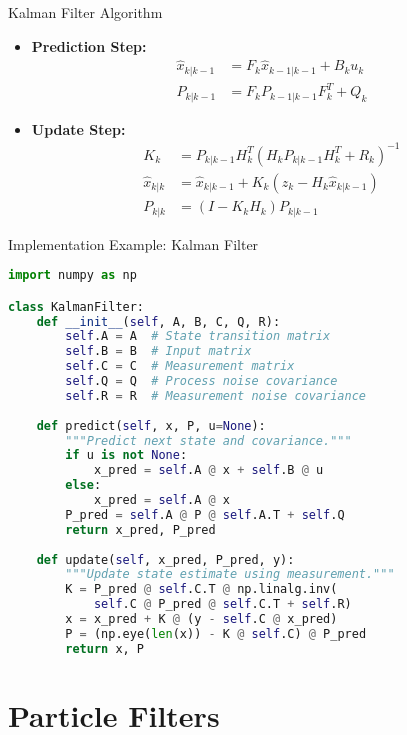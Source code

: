 \documentclass[aspectratio=169]{beamer}
\begin{document}
\begin{frame}{Kalman Filter Algorithm}
    \begin{itemize}
        \item<1-> \textbf{Prediction Step:}
            \begin{align*}
                \hat{x}_{k|k-1} &= F_k\hat{x}_{k-1|k-1} + B_ku_k \\
                P_{k|k-1} &= F_kP_{k-1|k-1}F_k^T + Q_k
            \end{align*}
        \item<2-> \textbf{Update Step:}
            \begin{align*}
                K_k &= P_{k|k-1}H_k^T(H_kP_{k|k-1}H_k^T + R_k)^{-1} \\
                \hat{x}_{k|k} &= \hat{x}_{k|k-1} + K_k(z_k - H_k\hat{x}_{k|k-1}) \\
                P_{k|k} &= (I - K_kH_k)P_{k|k-1}
            \end{align*}
    \end{itemize}
\end{frame}

\begin{frame}[fragile]{Implementation Example: Kalman Filter}
\begin{lstlisting}[language=Python]
import numpy as np

class KalmanFilter:
    def __init__(self, A, B, C, Q, R):
        self.A = A  # State transition matrix
        self.B = B  # Input matrix
        self.C = C  # Measurement matrix
        self.Q = Q  # Process noise covariance
        self.R = R  # Measurement noise covariance
        
    def predict(self, x, P, u=None):
        """Predict next state and covariance."""
        if u is not None:
            x_pred = self.A @ x + self.B @ u
        else:
            x_pred = self.A @ x
        P_pred = self.A @ P @ self.A.T + self.Q
        return x_pred, P_pred
    
    def update(self, x_pred, P_pred, y):
        """Update state estimate using measurement."""
        K = P_pred @ self.C.T @ np.linalg.inv(
            self.C @ P_pred @ self.C.T + self.R)
        x = x_pred + K @ (y - self.C @ x_pred)
        P = (np.eye(len(x)) - K @ self.C) @ P_pred
        return x, P
\end{lstlisting}
\end{frame}

\section{Particle Filters}
\end{document}
